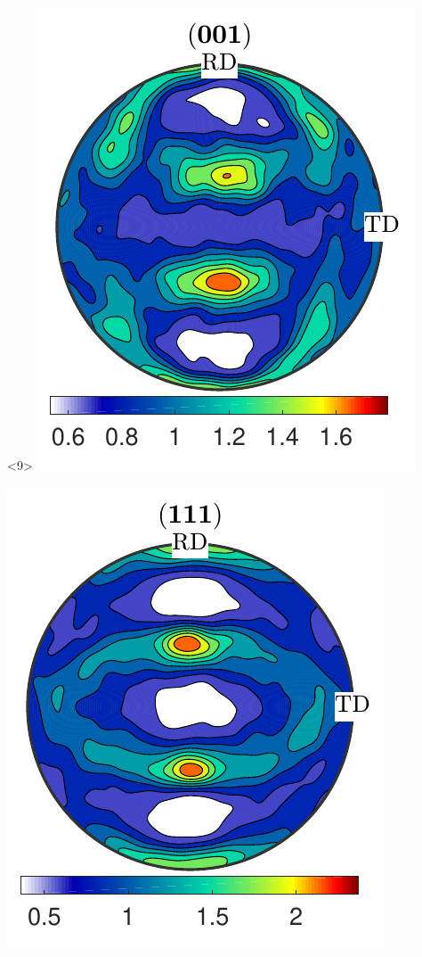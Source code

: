 \documentclass[compress]{beamer}
\begin{document}
\begin{frame}[fragile]
\begin{columns}
\begin{column}{0.29\textwidth}
                    \begin{onlyenv}<9>
        \includegraphics[width=\textwidth]{pic/rolling001_6}

      \includegraphics[width=\textwidth]{pic/rolling111_6}
    \end{onlyenv}


\end{column}
\end{columns}
\end{frame}
\end{document}
